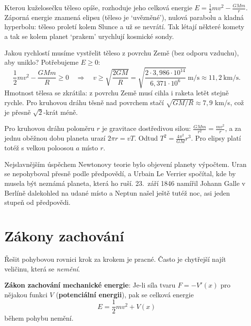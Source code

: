 Kterou kuželosečku těleso opíše, rozhoduje jeho celková energie $E = \frac{1}{2}mv^2 - \frac{GMm}{r}$. Záporná energie znamená elipsu (těleso je `uvězněné'), nulová parabolu a kladná hyperbolu: těleso proletí kolem Slunce a už se nevrátí. Tak létají některé komety a tak se kolem planet `prakem' urychlují kosmické sondy.

\begin{example}
  Jakou rychlostí musíme vystřelit těleso z povrchu Země (bez odporu vzduchu), aby uniklo? Potřebujeme $E\geq 0$:
  \begin{equation*}
    \frac{1}{2}mv^2 - \frac{GMm}{R}\geq 0\quad\Longrightarrow\quad v\geq\sqrt{\frac{2GM}{R}} = \sqrt{\frac{2\cdot 3{,}986\cdot 10^{14}}{6{,}371\cdot 10^6}}\ \mathrm{m/s}\approx 11{,}2\ \mathrm{km/s}.
  \end{equation*}
  Hmotnost tělesa se zkrátila: z povrchu Země musí cihla i raketa letět stejně rychle. Pro kruhovou dráhu těsně nad povrchem stačí $\sqrt{GM/R}\approx 7{,}9$ km/s, což je přesně $\sqrt{2}$-krát méně.
\end{example}

\begin{example}
  Pro kruhovou dráhu poloměru $r$ je gravitace dostředivou silou: $\frac{GMm}{r^2} = \frac{mv^2}{r}$, a za jednu oběžnou dobu planeta urazí $2\pi r = vT$. Odtud $T^2 = \frac{4\pi^2}{GM}r^3$. Pro elipsy platí totéž s velkou poloosou $a$ místo $r$.
\end{example}

Nejslavnějším úspěchem Newtonovy teorie bylo objevení planety výpočtem. Uran se nepohyboval přesně podle předpovědí, a Urbain Le Verrier spočítal, kde by musela být neznámá planeta, která ho ruší. 23.~září 1846 namířil Johann Galle v Berlíně dalekohled na udané místo a Neptun našel ještě tutéž noc, asi jeden stupeň od předpovědi.

\section{Zákony zachování}

Řešit pohybovou rovnici krok za krokem je pracné. Často je chytřejší najít veličinu, která se \textit{nemění}.

\begin{definitionbox}
  \textbf{Zákon zachování mechanické energie}: Je-li síla tvaru $F = -V'(x)$ pro nějakou funkci $V$ (\textbf{potenciální energii}), pak se celková energie
  \begin{equation*}
    E = \frac{1}{2}mv^2 + V(x)
  \end{equation*}
  během pohybu nemění.
\end{definitionbox}

